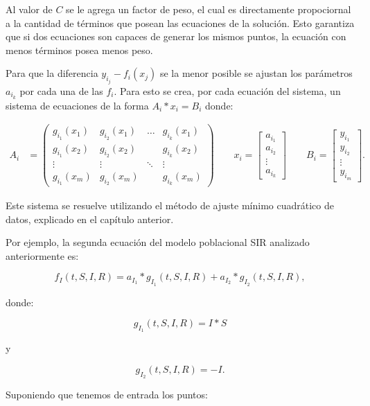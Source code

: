 Al valor de $C$ se le agrega un factor de peso, el cual es directamente propociornal a la cantidad de términos que posean las ecuaciones de la solución. Esto garantiza que si dos ecuaciones son capaces de generar los mismos puntos, la ecuación con menos términos posea menos peso.

Para que la diferencia $y_{i_j} - f_i(x_j)$ se la menor posible se ajustan los parámetros $a_{i_k}$ por cada una de las $f_i$. Para esto se crea, por cada ecuación del sistema, un sistema de ecuaciones de la forma $A_i * x_i = B_i$ donde:

\begin{align*}
    A_i & = \begin{pmatrix}
        g_{i_1}(x_1) & g_{i_2}(x_1) & \dots  & g_{i_k}(x_1) \\
        g_{i_1}(x_2) & g_{i_2}(x_2) &        & g_{i_k}(x_2) \\
        \vdots       & \vdots       & \ddots & \vdots       \\
        g_{i_1}(x_m) & g_{i_2}(x_m) &        & g_{i_k}(x_m)
    \end{pmatrix}
    \qquad
    x_i = \begin{bmatrix}
        a_{i_1} \\
        a_{i_2} \\
        \vdots  \\
        a_{i_k}
    \end{bmatrix}
    \qquad
    B_i = \begin{bmatrix}
        y_{i_1} \\
        y_{i_2} \\
        \vdots  \\
        y_{i_m}
    \end{bmatrix}.
\end{align*}

Este sistema se resuelve utilizando el método de ajuste mínimo cuadrático de datos, explicado en el capítulo anterior.

Por ejemplo, la segunda ecuación del modelo poblacional SIR analizado anteriormente es:

$$f_I (t,S,I,R) = a_{I_1} * g_{I_1}(t,S,I,R) + a_{I_2} * g_{I_2}(t,S,I,R),$$

donde:

$$g_{I_1}(t,S,I,R) = I*S$$

y

$$g_{I_2}(t,S,I,R) = -I.$$

Suponiendo que tenemos de entrada los puntos:

